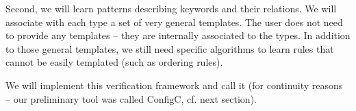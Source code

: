 Second, we will learn patterns describing keywords and their relations. We will associate with each type a set of very general templates. The user does not need to provide any templates -- they are internally associated to the types.
In addition to those general templates, we still need specific algorithms to learn
rules that cannot be easily templated (such as ordering rules). 

We will implement this verification framework and call it \app (for continuity reasons
-- our preliminary tool was called ConfigC, cf. next section).
